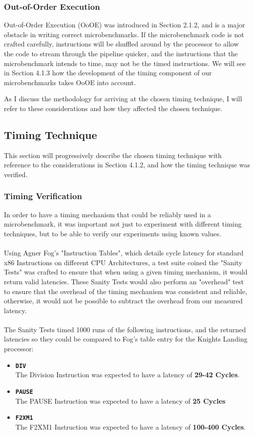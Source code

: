 \documentclass[bsc,frontabs,twoside,singlespacing,parskip,deptreport]{infthesis}     %
\begin{document}
\subsubsection{Out-of-Order Execution}
Out-of-Order Execution (OoOE) was introduced in Section 2.1.2, and is a major obstacle in writing correct microbenchmarks. If the microbenchmark code is not crafted carefully, instructions will be shuffled around by the processor to allow the code to stream through the pipeline quicker, and the instructions that the microbenchmark intends to time, may not be the timed instructions. We will see in Section 4.1.3 how the development of the timing component of our microbenchmarks takes OoOE into account.

As I discuss the methodology for arriving at the chosen timing technique, I will refer to these considerations and how they affected the chosen technique.

\subsection{Timing Technique}
This section will progressively describe the chosen timing technique with reference to the considerations in Section 4.1.2, and how the timing technique was verified.

\subsubsection{Timing Verification}
In order to have a timing mechanism that could be reliably used in a microbenchmark, it was important not just to experiment with different timing techniques, but to be able to verify our experiments using known values. \\
\\
Using Agner Fog's "Instruction Tables"\cite{inst_tables}, which details cycle latency for standard x86 Instructions on different CPU Architectures, a test suite coined the "Sanity Tests" was crafted to ensure that when using a given timing mechanism, it would return valid latencies. These Sanity Tests would also perform an "overhead" test to ensure that the overhead of the timing mechanism was consistent and reliable, otherwise, it would not be possible to subtract the overhead from our measured latency. \\
\\
The Sanity Tests timed 1000 runs of the following instructions, and the returned latencies so they could be compared to Fog's table entry for the Knights Landing processor:
\begin{itemize}
    \item{{\bf \texttt{DIV}} \\
        The Division Instruction was expected to have a latency of \textbf{29-42 Cycles}.
    }
    \item{{\bf \texttt{PAUSE}} \\
        The PAUSE Instruction was expected to have a latency of \textbf{25 Cycles}
    }
    \item{{\bf \texttt{F2XM1}} \\
        The F2XM1 Instruction was expected to have a latency of \textbf{100-400 Cycles}.
    }
\end{itemize}
\end{document}
